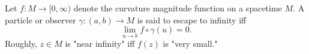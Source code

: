 Let $f: M \to [0, \infty)$ denote the curvature magnitude function on a spacetime $M$. A particle or observer $\gamma: (a, b) \to M$ is said to escape to infinity iff
$$\lim_{u \to b} f \circ \gamma(u) = 0.$$
Roughly, $z \in M$ is "near infinity" iff $f(z)$ is "very small."
